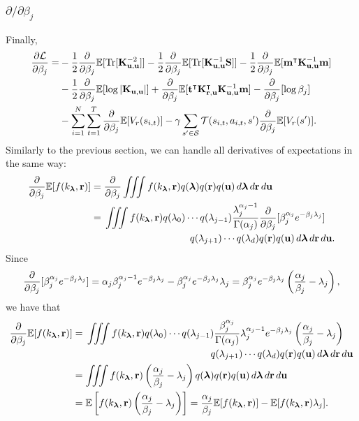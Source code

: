 \documentclass{mprop}
\theoremstyle{definition}
\DeclareMathOperator{\Tr}{Tr}
\begin{document}
\subsubsection{$\partial/\partial\beta_j$}
Finally,
\[
  \begin{split}
    \frac{\partial\mathcal{L}}{\partial\beta_j} = &-
    \frac{1}{2}\db\mathbb{E}[\Tr[\Kuu^{-2}]] -
    \frac{1}{2}\db\mathbb{E}[\Tr[\Kuu^{-1}\mathbf{S}]] -
    \frac{1}{2}\db\mathbb{E}[\mathbf{m}^\intercal\Kuu^{-1}\mathbf{m}] \\
    &- \frac{1}{2}\db\mathbb{E}[\log|\Kuu|] +
    \db\mathbb{E}[\mathbf{t}^\intercal\Kru^\intercal\Kuu^{-1}\mathbf{m}] -
    \db[\log\beta_j] \\
    &- \sum_{i=1}^N \sum_{t=1}^T \db \mathbb{E}[V_r(s_{i,t})] - \gamma\sum_{s'
      \in \mathcal{S}} \mathcal{T}(s_{i,t}, a_{i,t}, s')\db\mathbb{E}[V_r(s')].
  \end{split}
\]
Similarly to the previous section, we can handle all derivatives of expectations
in the same way:
\[
  \begin{split}
    \db\mathbb{E}[f(k_{\bm\lambda}, \mathbf{r})] &= \db \iiint f(k_{\bm\lambda},
    \mathbf{r}) q(\bm\lambda) q(\mathbf{r})
    q(\mathbf{u})\,d\bm\lambda\,d\mathbf{r}\,d\mathbf{u} \\
    &= \!\begin{multlined}[t]
      \iiint f(k_{\bm\lambda}, \mathbf{r}) q(\lambda_0) \cdots q(\lambda_{j-1})
      \frac{\lambda_j^{\alpha_j - 1}}{\Gamma(\alpha_j)} \db [\beta_j^{\alpha_j}
      e^{-\beta_j\lambda_j}] \\
      q(\lambda_{j+1}) \cdots q(\lambda_d) q(\mathbf{r})
      q(\mathbf{u})\,d\bm\lambda\,d\mathbf{r}\,d\mathbf{u}.
    \end{multlined}
  \end{split}
\]
Since
\[ \frac{\partial}{\partial\beta_j} [\beta_j^{\alpha_j} e^{-\beta_j\lambda_j}] = \alpha_j\beta_j^{\alpha_j - 1}e^{-\beta_j\lambda_j}
  - \beta_j^{\alpha_j} e^{-\beta_j\lambda_j}\lambda_j = \beta_j^{\alpha_j}
  e^{-\beta_j\lambda_j} \left( \frac{\alpha_j}{\beta_j} - \lambda_j \right), \]
we have that
\[
  \begin{split}
    \db\mathbb{E}[f(k_{\bm\lambda}, \mathbf{r})] &= \!\begin{multlined}[t]
      \iiint f(k_{\bm\lambda}, \mathbf{r}) q(\lambda_0) \cdots q(\lambda_{j-1})
      \frac{\beta_j^{\alpha_j}}{\Gamma(\alpha_j)}\lambda_j^{\alpha_j -
        1}e^{-\beta_j\lambda_j} \left(\frac{\alpha_j}{\beta_j} - \lambda_j
      \right) \\
      q(\lambda_{j+1}) \cdots q(\lambda_d) q(\mathbf{r})
      q(\mathbf{u})\,d\bm\lambda\,d\mathbf{r}\,d\mathbf{u}
    \end{multlined}
    \\
    &= \iiint f(k_{\bm\lambda}, \mathbf{r}) \left(\frac{\alpha_j}{\beta_j} -
      \lambda_j \right) q(\bm\lambda) q(\mathbf{r})
    q(\mathbf{u})\,d\bm\lambda\,d\mathbf{r}\,d\mathbf{u} \\
    &= \mathbb{E} \left[ f(k_{\bm\lambda}, \mathbf{r})
      \left(\frac{\alpha_j}{\beta_j} - \lambda_j \right) \right] =
    \frac{\alpha_j}{\beta_j}\mathbb{E}[f(k_{\bm\lambda}, \mathbf{r})] -
    \mathbb{E}[f(k_{\bm\lambda}, \mathbf{r})\lambda_j].
  \end{split}
\]
\end{document}
